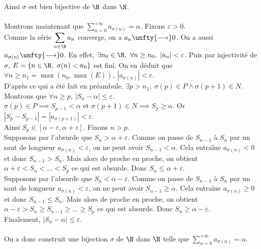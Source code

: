 \documentclass{book}
\begin{document}
	Ainsi $\sigma$ est bien bijective de $\N$ dans $\N$.\\\\
	Montrons maintenant que $\displaystyle\sum\limits_{n=0}^{+\infty}a_{\sigma(n)}=\alpha$. Fixons $\varepsilon>0$.\\
	Comme la série $\displaystyle\sum\limits_{n\in \N}a_n$ converge, on a $a_n\unfty{\longrightarrow}0$. On a aussi $a_{\sigma(n)}\unfty{\longrightarrow}0$. En effet, $\exists n_0\in \N,\ \forall n\geq n_0,\ |a_n|<\varepsilon$. Puis par injectivité de $\sigma$, $E=\{n\in \N,\ \sigma(n)<n_0\}$ est fini. On en déduit que $\forall n\geq n_1=\max(n_0,\max(E)),\ |a_{\sigma(n)}|<\varepsilon$.\\
	D'après ce qui a été fait en préambule, $\exists p>n_1,\ \sigma(p)\in P\land \sigma(p+1)\in N$. Montrons que $\forall n\geq p,\ |S_n-\alpha|\leq\varepsilon$.\\
	$\sigma(p)\in P\implies S_{p-1}<\alpha$ et $\sigma(p+1)\in N\implies S_p\geq\alpha$. Or $|S_p-S_{p-1}|=|a_{\sigma(p+1)}|<\varepsilon$.\\
	Ainsi $S_p\in [\alpha-\varepsilon,\alpha+\varepsilon]$. Fixons $n>p$.\\
	Supposons par l'absurde que $S_n>\alpha+\varepsilon$. Comme on passe de $S_{n-1}$ à $S_n$ par un saut de longueur $a_{\sigma(n)}<\varepsilon$, on ne peut avoir $S_{n-1}<\alpha$. Cela entraîne $a_{\sigma(n)}<0$ et donc $S_{n-1}>S_n$. Mais alors de proche en proche, on obtient $\alpha+\varepsilon<S_n<\dots<
	S_p$ ce qui est absurde. Donc $S_n\leq\alpha+\varepsilon$.\\
	Supposons par l'absurde que $S_n<\alpha-\varepsilon$. Comme on passe de $S_{n-1}$ à $S_n$ par un saut de longueur $a_{\sigma(n)}<\varepsilon$, on ne peut avoir $S_{n-1}\geq\alpha$. Cela entraîne $a_{\sigma(n)}\geq 0$ et donc $S_{n-1}\leq S_n$. Mais alors de proche en proche, on obtient $\alpha-\varepsilon>S_n\geq S_{n-1}\geq\dots\geq S_p$ ce qui est absurde. Donc $S_n\geq\alpha-\varepsilon$.\\
	Finalement, $|S_n-\alpha|\leq \varepsilon$.\\\\
	On a donc construit une bijection $\sigma$ de $\N$ dans $\N$ telle que $\displaystyle\sum\limits_{n=0}^{+\infty}a_{\sigma(n)}=\alpha$.
	
\end{document}
